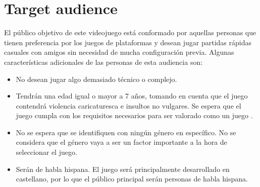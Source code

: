 \section{Target audience}%

El público objetivo de este videojuego está conformado por aquellas personas que
tienen preferencia por los juegos de plataformas y desean jugar partidas rápidas
casuales con amigos sin necesidad de mucha configuración previa. Algunas
características adicionales de las personas de esta audiencia son:

\begin{itemize}
    \item No desean jugar algo demasiado técnico o complejo.
    \item Tendrán una edad igual o mayor a 7 años, tomando en cuenta que el
    juego contendrá violencia caricaturesca e insultos no vulgares. Se espera
    que el juego cumpla con los requisitos necesarios para ser valorado como un
    juego .
    \item No se espera que se identifiquen con ningún género en específico. No
    se considera que el género vaya a ser un factor importante a la hora de
    seleccionar el juego.
    \item Serán de habla hispana. El juego será principalmente desarrollado en
    castellano, por lo que el público principal serán personas de habla hispana.
\end{itemize}